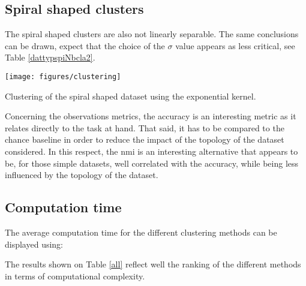 \documentclass[12pt,a4paper,fleqn]{tufte-handout}
\begin{document}
\subsection{Spiral shaped clusters}

The spiral shaped clusters are also not linearly separable. The same conclusions can be drawn, expect that the choice of the $\sigma$ value appears as less critical, see Table \ref{dattypspiNbcla2}.


\begin{marginfigure}
\texttt{[image: figures/clustering]}
\caption{Clustering of the spiral shaped dataset using the exponential kernel.}
\label{clustering}
\end{marginfigure}

Concerning the observations metrics, the accuracy is an interesting metric as it relates directly to the task at hand. That said, it has to be compared to the chance baseline in order to reduce the impact of the topology of the dataset considered. In this respect, the nmi is an interesting alternative that appears to be, for those simple datasets, well correlated with the accuracy, while being less influenced by the topology of the dataset.

\subsection{Computation time}

The average computation time for the different clustering methods can be displayed using:

The results shown on Table \ref{all} reflect well the ranking of the different methods in terms of computational complexity.

  
  
  
  
 
 
  
\end{document}
